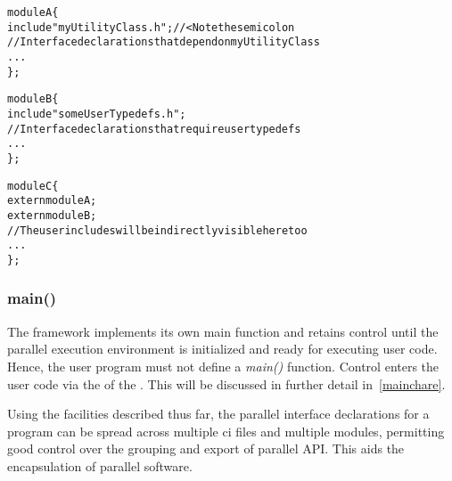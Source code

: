 \begin{alltt}
module A \{
    include "myUtilityClass.h"; //< Note the semicolon
    // Interface declarations that depend on myUtilityClass
    ...
\};

module B \{
    include "someUserTypedefs.h";
    // Interface declarations that require user typedefs
    ...
\};

module C \{
    extern module A;
    extern module B;
    // The user includes will be indirectly visible here too
    ...
\};
\end{alltt}


\subsubsection{main()}

The \charmpp framework implements its own main\(\) function and retains control
until the parallel execution environment is initialized and ready for executing
user code. Hence, the user program must not define a \emph{main()} function.
Control enters the user code via the  of the .
This will be discussed in further detail in~\ref{mainchare}.

Using the facilities described thus far, the parallel interface declarations
for a \charm program can be spread across multiple ci files and multiple
modules, permitting good control over the grouping and export of parallel API.
This aids the encapsulation of parallel software.



